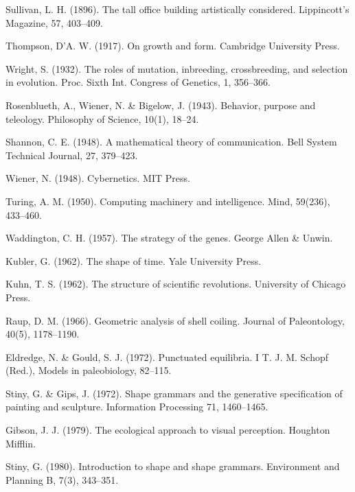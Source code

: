 \documentclass[10pt]{article}
\begin{document}
Sullivan, L. H. (1896). The tall office building artistically considered. Lippincott's Magazine, 57, 403–409.




Thompson, D'A. W. (1917). On growth and form. Cambridge University Press.




Wright, S. (1932). The roles of mutation, inbreeding, crossbreeding, and selection in evolution. Proc. Sixth Int. Congress of Genetics, 1, 356–366.




Rosenblueth, A., Wiener, N. \& Bigelow, J. (1943). Behavior, purpose and teleology. Philosophy of Science, 10(1), 18–24.




Shannon, C. E. (1948). A mathematical theory of communication. Bell System Technical Journal, 27, 379–423.




Wiener, N. (1948). Cybernetics. MIT Press.




Turing, A. M. (1950). Computing machinery and intelligence. Mind, 59(236), 433–460.




Waddington, C. H. (1957). The strategy of the genes. George Allen \& Unwin.




Kubler, G. (1962). The shape of time. Yale University Press.




Kuhn, T. S. (1962). The structure of scientific revolutions. University of Chicago Press.




Raup, D. M. (1966). Geometric analysis of shell coiling. Journal of Paleontology, 40(5), 1178–1190.




Eldredge, N. \& Gould, S. J. (1972). Punctuated equilibria. I T. J. M. Schopf (Red.), Models in paleobiology, 82–115.




Stiny, G. \& Gips, J. (1972). Shape grammars and the generative specification of painting and sculpture. Information Processing 71, 1460–1465.




Gibson, J. J. (1979). The ecological approach to visual perception. Houghton Mifflin.




Stiny, G. (1980). Introduction to shape and shape grammars. Environment and Planning B, 7(3), 343–351.
\end{document}
